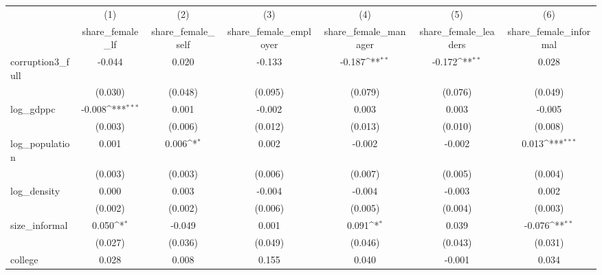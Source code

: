 {
\def\sym#1{\ifmmode^{#1}\else\(^{#1}\)\fi}
\begin{tabular}{l*{6}{c}}
\hline\hline
            &\multicolumn{1}{c}{(1)}&\multicolumn{1}{c}{(2)}&\multicolumn{1}{c}{(3)}&\multicolumn{1}{c}{(4)}&\multicolumn{1}{c}{(5)}&\multicolumn{1}{c}{(6)}\\
            &\multicolumn{1}{c}{share\_female\_lf}&\multicolumn{1}{c}{share\_female\_self}&\multicolumn{1}{c}{share\_female\_employer}&\multicolumn{1}{c}{share\_female\_manager}&\multicolumn{1}{c}{share\_female\_leaders}&\multicolumn{1}{c}{share\_female\_informal}\\
\hline
corruption3\_full&      -0.044         &       0.020         &      -0.133         &      -0.187\sym{**} &      -0.172\sym{**} &       0.028         \\
            &     (0.030)         &     (0.048)         &     (0.095)         &     (0.079)         &     (0.076)         &     (0.049)         \\
[1em]
log\_gdppc   &      -0.008\sym{***}&       0.001         &      -0.002         &       0.003         &       0.003         &      -0.005         \\
            &     (0.003)         &     (0.006)         &     (0.012)         &     (0.013)         &     (0.010)         &     (0.008)         \\
[1em]
log\_population&       0.001         &       0.006\sym{*}  &       0.002         &      -0.002         &      -0.002         &       0.013\sym{***}\\
            &     (0.003)         &     (0.003)         &     (0.006)         &     (0.007)         &     (0.005)         &     (0.004)         \\
[1em]
log\_density &       0.000         &       0.003         &      -0.004         &      -0.004         &      -0.003         &       0.002         \\
            &     (0.002)         &     (0.002)         &     (0.006)         &     (0.005)         &     (0.004)         &     (0.003)         \\
[1em]
size\_informal&       0.050\sym{*}  &      -0.049         &       0.001         &       0.091\sym{*}  &       0.039         &      -0.076\sym{**} \\
            &     (0.027)         &     (0.036)         &     (0.049)         &     (0.046)         &     (0.043)         &     (0.031)         \\
[1em]
college     &       0.028         &       0.008         &       0.155         &       0.040         &      -0.001         &       0.034         \\

\end{tabular}}
